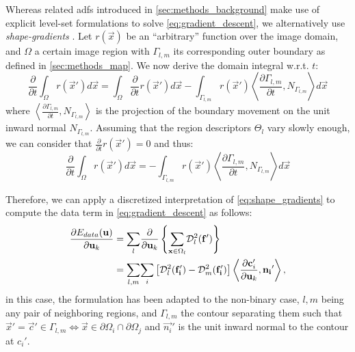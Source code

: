 Whereas related \glspl*{adf} introduced in \autoref{sec:methods_background}
make use of explicit level-set formulations to solve \eqref{eq:gradient_descent},
we alternatively use \emph{shape-gradients}
\cite{besson_dream2s_2003,herbulot_segmentation_2006}.
Let $r(\vec{x})$ be an ``arbitrary'' function over the image domain,
and $\Omega$ a certain image region with $\Gamma_{l,m}$ its corresponding
outer boundary as defined in \autoref{sec:methods_map}.
We now derive the domain integral w.r.t. $t$:
\begin{equation*}
\frac{\partial}{\partial t} \int_\Omega r(\vec{x}') d\vec{x} = \int_\Omega \frac{\partial}{\partial t}r(\vec{x}') d\vec{x} - \int_{\Gamma_{l,m}} r(\vec{x}') \left\langle \frac{\partial \Gamma_{l,m} }{\partial t}, N_{\Gamma_{l,m}}\right\rangle d\vec{x}
\end{equation*}
where $\left\langle\frac{\partial\Gamma_{l,m}}{\partial t}, N_{\Gamma_{l,m}}\right\rangle$ is
the projection of the boundary movement on the unit inward normal $N_{\Gamma_{l,m}}$. Assuming
that the region descriptors $\Theta_l$ vary slowly enough, we can consider
that $\frac{\partial}{\partial t} r(\vec{x}') = 0$ and thus:
\begin{equation}
\frac{\partial}{\partial t} \int_\Omega r(\vec{x}') d\vec{x} =
- \int_{\Gamma_{l,m}} r(\vec{x}') \left\langle \frac{\partial \Gamma_{l,m} }{\partial t}, N_{\Gamma_{l,m}}\right\rangle d\vec{x}
\label{eq:shape_gradients}
\end{equation}

Therefore, we can apply a discretized interpretation of \eqref{eq:shape_gradients}
to compute the data term in \eqref{eq:gradient_descent} as follows:
\begin{align}
\frac{\partial E_{data}(\vec{u})}{\partial \vec{u}_k} &=
\underset{l}{\sum} \frac{ \partial }{\partial \vec{u}_k} \left\{
 \underset{\vec{x} \in \Omega_l}{\sum} \mdist{f'}{l} \right\} \notag\\
&= \underset{l,m}{\sum} \underset{i}{\sum}
\left[ \mdist{f_i'}{l} - \mdist{f_i'}{m} \right]
\left\langle \frac{\partial \vec{c}_i'}{\partial \vec{u}_k}, \vec{n_i}'\right\rangle,
\label{eq:gradient_wshape}
\end{align}
in this case, the formulation has been adapted to the non-binary case, $l,m$
being any pair of neighboring regions, and $\Gamma_{l,m}$ the contour separating
them such that $\vec{x}' = \vec{c}' \in\Gamma_{l,m} \iff \vec{x}\in \partial\Omega_i \cap \partial\Omega_j$
and $\vec{n_i}'$ is the unit inward normal to the contour at $c_i'$.

